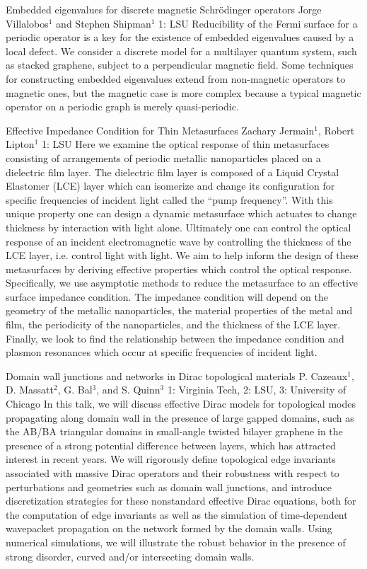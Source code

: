 \vspace{1.5ex}
\abs
{Embedded eigenvalues for discrete magnetic Schrödinger operators}
{Jorge Villalobos$^{1}$ and Stephen Shipman$^{1}$}
{1: LSU}
{Reducibility of the Fermi surface for a periodic operator is a key for the existence of embedded eigenvalues caused by a local defect.  We consider a discrete model for a multilayer quantum system, such as stacked graphene, subject to a perpendicular magnetic field.  Some techniques for constructing embedded eigenvalues extend from non-magnetic operators to magnetic ones, but the magnetic case is more complex because a typical magnetic operator on a periodic graph is merely quasi-periodic.}


\vspace{1.5ex}
\abs
{Effective Impedance Condition for Thin Metasurfaces}
{Zachary Jermain$^{1}$, Robert Lipton$^{1}$}
{1: LSU}
{Here we examine the optical response of thin metasurfaces consisting of arrangements of periodic metallic nanoparticles placed on a dielectric film layer. The dielectric film layer is composed of a Liquid Crystal Elastomer (LCE) layer which can isomerize and change its configuration for specific frequencies of incident light called the ``pump frequency”. With this unique property one can design a dynamic metasurface which actuates to change thickness by interaction with light alone. Ultimately one can control the optical response of an incident electromagnetic wave by controlling the thickness of the LCE layer, i.e. control light with light. We aim to help inform the design of these metasurfaces by deriving effective properties which control the optical response. Specifically, we use asymptotic methods to reduce the metasurface to an effective surface impedance condition. The impedance condition will depend on the geometry of the metallic nanoparticles, the material properties of the metal and film, the periodicity of the nanoparticles, and the thickness of the LCE layer. Finally, we look to find the relationship between the impedance condition and plasmon resonances which occur at specific frequencies of incident light.}


\vspace{1.5ex}
\abs
{Domain wall junctions and networks in Dirac topological materials}
{P. Cazeaux$^{1}$, D. Massatt$^{2}$, G. Bal$^3$, and S. Quinn$^3$}
{1: Virginia Tech, 2: LSU, 3: University of Chicago}
{In this talk, we will discuss effective Dirac models for topological modes propagating along domain wall in the presence of large gapped domains, such as the AB/BA triangular domains in small-angle twisted bilayer graphene in the presence of a strong potential difference between layers, which has attracted interest in recent years. We will rigorously define topological edge invariants associated with massive Dirac operators and their robustness with respect to perturbations and geometries such as domain wall junctions, and introduce discretization strategies for these nonstandard effective Dirac equations, both for the computation of edge invariants as well as the simulation of time-dependent wavepacket propagation on the network formed by the domain walls. Using numerical simulations, we will illustrate the robust behavior in the presence of strong disorder, curved and/or intersecting domain walls.}


